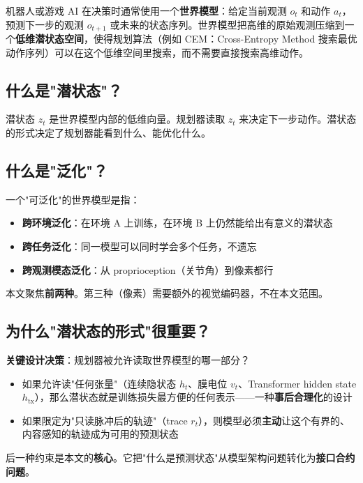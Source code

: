 \documentclass[11pt,a4paper]{article}
\begin{document}
机器人或游戏 AI 在决策时通常使用一个\textbf{世界模型}：给定当前观测 $o_t$ 和动作 $a_t$，预测下一步的观测 $o_{t+1}$ 或未来的状态序列。世界模型把高维的原始观测压缩到一个\textbf{低维潜状态空间}，使得规划算法（例如 CEM：Cross-Entropy Method 搜索最优动作序列）可以在这个低维空间里搜索，而不需要直接搜索高维动作。

\subsection{什么是"潜状态"？}

潜状态 $z_t$ 是世界模型内部的低维向量。规划器读取 $z_t$ 来决定下一步动作。潜状态的形式决定了规划器能看到什么、能优化什么。

\subsection{什么是"泛化"？}

一个"可泛化"的世界模型是指：

\begin{itemize}[leftmargin=2em]
    \item \textbf{跨环境泛化}：在环境 A 上训练，在环境 B 上仍然能给出有意义的潜状态
    \item \textbf{跨任务泛化}：同一模型可以同时学会多个任务，不遗忘
    \item \textbf{跨观测模态泛化}：从 proprioception（关节角）到像素都行
\end{itemize}

本文聚焦\textbf{前两种}。第三种（像素）需要额外的视觉编码器，不在本文范围。

\subsection{为什么"潜状态的形式"很重要？}

\textbf{关键设计决策}：规划器被允许读取世界模型的哪一部分？

\begin{itemize}[leftmargin=2em]
    \item 如果允许读"任何张量"（连续隐状态 $h_t$、膜电位 $v_t$、Transformer hidden state $h_\text{tx}$），那么潜状态就是训练损失最方便的任何表示——一种\textbf{事后合理化}的设计
    \item 如果限定为"只读脉冲后的轨迹"（trace $r_t$），则模型必须\textbf{主动}让这个有界的、内容感知的轨迹成为可用的预测状态
\end{itemize}

后一种约束是本文的\textbf{核心}。它把"什么是预测状态"从模型架构问题转化为\textbf{接口合约问题}。
\end{document}
